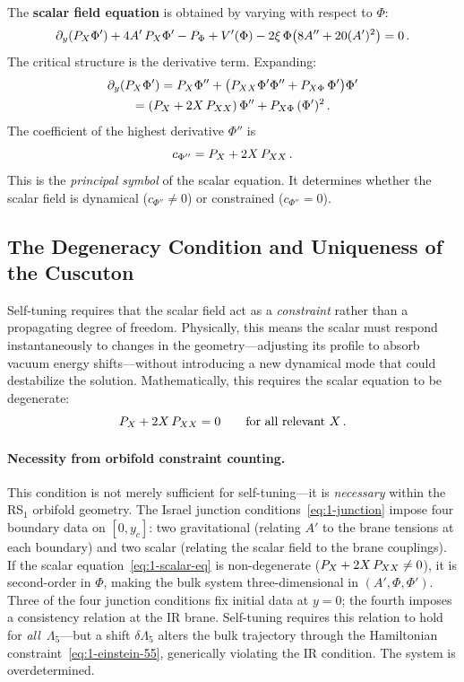 The \textbf{scalar field equation} is obtained by varying with respect to $\Phi$:
\begin{equation}
\label{eq:1-scalar-eq}
\partial_y(P_X \Phi') + 4A'\, P_X \Phi' - P_\Phi + V'(\Phi) - 2\xi\,\Phi\bigl(8A'' + 20(A')^2\bigr) = 0\,.
\end{equation}
The critical structure is the derivative term. Expanding:
\begin{multline}
\label{eq:1-scalar-expand}
\partial_y(P_X \Phi') = P_X \Phi'' + \bigl(P_{XX} \Phi'\Phi'' + P_{X\Phi}\,\Phi'\bigr)\Phi' \\
= (P_X + 2X\,P_{XX})\,\Phi'' + P_{X\Phi}\,(\Phi')^2\,.
\end{multline}
The coefficient of the highest derivative $\Phi''$ is
\begin{equation}
\label{eq:1-principal}
c_{\Phi''} = P_X + 2X\,P_{XX}\,.
\end{equation}
This is the \emph{principal symbol} of the scalar equation. It determines whether the scalar field is dynamical ($c_{\Phi''} \neq 0$) or constrained ($c_{\Phi''} = 0$).

\subsection{The Degeneracy Condition and Uniqueness of the Cuscuton}
\label{sec:1-degeneracy}

Self-tuning requires that the scalar field act as a \emph{constraint} rather than a propagating degree of freedom. Physically, this means the scalar must respond instantaneously to changes in the geometry---adjusting its profile to absorb vacuum energy shifts---without introducing a new dynamical mode that could destabilize the solution. Mathematically, this requires the scalar equation to be degenerate:
\begin{equation}
\label{eq:1-degen}
P_X + 2X\,P_{XX} = 0 \qquad \text{for all relevant } X\,.
\end{equation}

\paragraph{Necessity from orbifold constraint counting.} This condition is not merely sufficient for self-tuning---it is \emph{necessary} within the RS$_1$ orbifold geometry. The Israel junction conditions~\eqref{eq:1-junction} impose four boundary data on $[0, y_c]$: two gravitational (relating $A'$ to the brane tensions at each boundary) and two scalar (relating the scalar field to the brane couplings). If the scalar equation~\eqref{eq:1-scalar-eq} is non-degenerate ($P_X + 2X\,P_{XX} \neq 0$), it is second-order in $\Phi$, making the bulk system three-dimensional in $(A', \Phi, \Phi')$. Three of the four junction conditions fix initial data at $y = 0$; the fourth imposes a consistency relation at the IR brane. Self-tuning requires this relation to hold for \emph{all}~$\Lambda_5$---but a shift $\delta\Lambda_5$ alters the bulk trajectory through the Hamiltonian constraint~\eqref{eq:1-einstein-55}, generically violating the IR condition. The system is overdetermined.

